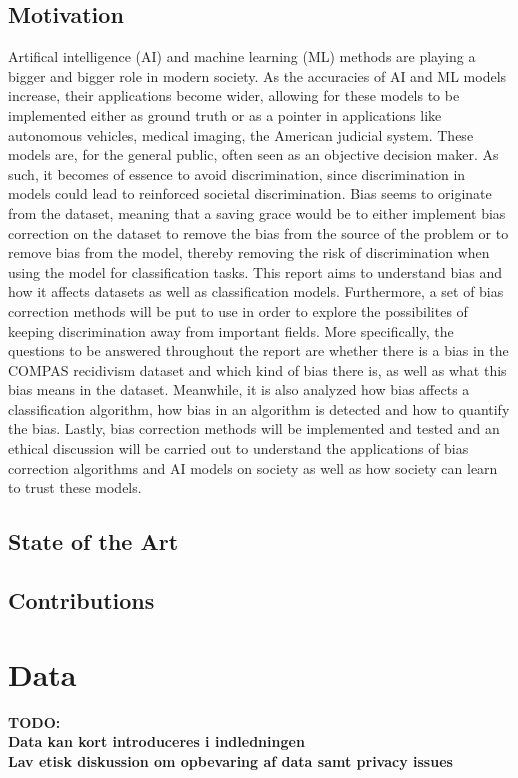 \documentclass[11pt, fleqn, titlepage]{article}
\begin{document}
	\subsection{Motivation}
	Artifical intelligence (AI) and machine learning (ML) methods are playing a bigger and bigger role in modern society. As the accuracies of AI and ML models increase, their applications become wider, allowing for these  models to be implemented either as ground truth or as a pointer in applications like autonomous vehicles, medical imaging, the American judicial system. These models are, for the general public, often seen as an objective decision maker. As such, it becomes of essence to avoid discrimination, since discrimination in models could lead to reinforced societal discrimination. Bias seems to originate from the dataset, meaning that a saving grace would be to either implement bias correction on the dataset to remove the bias from the source of the problem or to remove bias from the model, thereby removing the risk of discrimination when using the model for classification tasks. This report aims to understand bias and how it affects datasets as well as classification models. Furthermore, a set of bias correction methods will be put to use in order to explore the possibilites of keeping discrimination away from important fields. More specifically, the questions to be answered throughout the report are whether there is a bias in the COMPAS recidivism dataset and which kind of bias there is, as well as what this bias means in the dataset. Meanwhile, it is also analyzed how bias affects a classification algorithm, how bias in an algorithm is detected and how to quantify the bias. Lastly, bias correction methods will be implemented and tested and an ethical discussion will be carried out to understand the applications of bias correction algorithms and AI models on society as well as how society can learn to trust these models. 
	
	\subsection{State of the Art}
	
	
	\subsection{Contributions}

	
	
	\section{Data}
	\textbf{TODO: \\ Data kan kort introduceres i indledningen \\ Lav etisk diskussion om opbevaring af data samt privacy issues}
	
\end{document}
